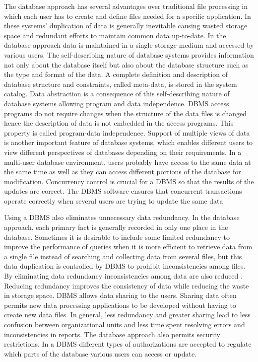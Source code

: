 The database approach has several advantages over traditional file processing in
which each user has to create and define files needed for a specific
application. In these systems' duplication of data is generally inevitable
causing wasted storage space and redundant efforts to maintain common data
up-to-date. In the database approach data is maintained in a single storage
medium and accessed by various users. The self-describing nature of database
systems provides information not only about the database itself but also about
the database structure such as the type and format of the data. A complete
definition and description of database structure and constraints, called
meta-data, is stored in the system catalog. Data abstraction is a consequence of
this self-describing nature of database systems allowing program and data
independence. DBMS access programs do not require changes when the structure of
the data files is changed hence the description of data is not embedded in the
access programs. This property is called program-data independence. Support of
multiple views of data is another important feature of database systems, which
enables different users to view different perspectives of databases depending on
their requirements. In a multi-user database environment, users probably have
access to the same data at the same time as well as they can access different
portions of the database for modification. Concurrency control is crucial for a
DBMS so that the results of the updates are correct. The DBMS software ensures
that concurrent transactions operate correctly when several users are trying to
update the same data

Using a DBMS also eliminates unnecessary data redundancy. In the database
approach, each primary fact is generally recorded in only one place in the
database. Sometimes it is desirable to include some limited redundancy to
improve the performance of queries when it is more efficient to retrieve data
from a single file instead of searching and collecting data from several files,
but this data duplication is controlled by DBMS to prohibit inconsistencies
among files. By eliminating data redundancy inconsistencies among data are also
reduced \cite{elmasri1998}. Reducing redundancy improves the consistency of data
while reducing the waste in storage space. DBMS allows data sharing to the
users. Sharing data often permits new data processing applications to be
developed without having to create new data files. In general, less redundancy
and greater sharing lead to less confusion between organizational units and less
time spent resolving errors and inconsistencies in reports. The database
approach also permits security restrictions. In a DBMS different types of
authorizations are accepted to regulate which parts of the database various
users can access or update.